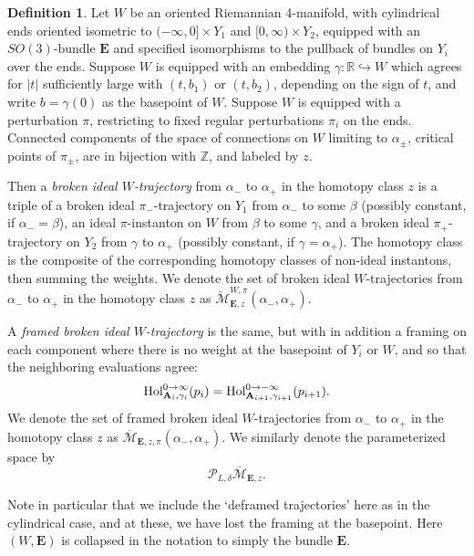 \documentclass{memo-l}
\theoremstyle{definition}
\newtheorem{definition}[theorem]{Definition}
\theoremstyle{remark}
\numberwithin{section}{chapter}
\numberwithin{equation}{chapter}
\begin{document}
\begin{definition}
Let $W$ be an oriented Riemannian 4-manifold, with cylindrical ends oriented isometric to $(-\infty, 0] \times Y_1$ and $[0,\infty) \times Y_2$, equipped with an $SO(3)$-bundle $\mathbf{E}$ and specified isomorphisms to the pullback of bundles on $Y_i$ over the ends. Suppose $W$ is equipped with an embedding $\gamma:\mathbb R \hookrightarrow W$ which agrees for $|t|$ sufficiently large with $(t,b_1)$ or $(t,b_2)$, depending on the sign of $t$, and write $b = \gamma(0)$ as the basepoint of $W$. Suppose $W$ is equipped with a perturbation $\pi$, restricting to fixed regular perturbations $\pi_i$ on the ends. Connected components of the space of connections on $W$ limiting to $\alpha_\pm$, critical points of $\pi_\pm$, are in bijection with $\mathbb Z$, and labeled by $z$.

Then a \emph{broken ideal $W$-trajectory} from $\alpha_-$ to $\alpha_+$ in the homotopy class $z$ is a triple of a broken ideal $\pi_-$-trajectory on $Y_1$ from $\alpha_-$ to some $\beta$ (possibly constant, if $\alpha_- = \beta$), an ideal $\pi$-instanton on $W$ from $\beta$ to some $\gamma$, and a broken ideal $\pi_+$-trajectory on $Y_2$ from $\gamma$ to $\alpha_+$ (possibly constant, if $\gamma = \alpha_+$). The homotopy class is the composite of the corresponding homotopy classes of non-ideal instantons, then summing the weights. We denote the set of broken ideal $W$-trajectories from $\alpha_-$ to $\alpha_+$ in the homotopy class $z$ as $\check{\mathcal M}^{W,\pi}_{\mathbf{E},z}(\alpha_-, \alpha_+)$.

A \emph{framed broken ideal $W$-trajectory} is the same, but with in addition a framing on each component where there is no weight at the basepoint of $Y_i$ or $W$, and so that the neighboring evaluations agree: $$\textup{Hol}^{0 \to \infty}_{\mathbf{A}_i,\gamma_i}(p_i) = \textup{Hol}^{0 \to -\infty}_{\mathbf{A}_{i+1}, \gamma_{i+1}}(p_{i+1}).$$ We denote the set of framed broken ideal $W$-trajectories from $\alpha_-$ to $\alpha_+$ in the homotopy class $z$ as $\overline{\mathcal M}_{\mathbf{E},z,\pi}(\alpha_-, \alpha_+)$. We similarly denote the parameterized space by $$\mathcal P_{L,\delta} \overline{\mathcal M}_{\mathbf{E},z}.$$
\end{definition}

Note in particular that we include the `deframed trajectories' here as in the cylindrical case, and at these, we have lost the framing at the basepoint. Here $(W,\mathbf{E})$ is collapsed in the notation to simply the bundle $\mathbf{E}$.
\end{document}
